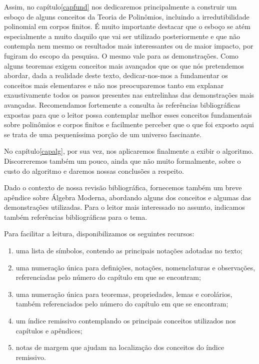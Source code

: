 Assim, no capítulo\xspace\ref{capfund} nos dedicaremos principalmente a
construir um esboço de alguns conceitos da Teoria de Polinômios,
incluindo a irredutibilidade polinomial em corpos finitos. É muito
importante destacar que o esboço se atém especialmente a muito daquilo
que vai
ser utilizado posteriormente e que não contempla nem mesmo os resultados
mais interessantes ou de maior impacto, por fugiram do escopo da
pesquisa. O mesmo vale para as
demonstrações. Como alguns teoremas exigem conceitos mais avançados que
os que nós pretendemos abordar, dada a realidade deste
texto,
dedicar-nos-mos a fundamentar os conceitos mais
elementares e não nos preocuparemos tanto em explanar exaustivamente
todos
os passos presentes nas entrelinhas das demonstrações mais
avançadas. Recomendamos fortemente a consulta às referências
bibliográficas expostas para que o leitor possa contemplar melhor esses
conceitos fundamentais sobre polinômios e corpos finitos e facilmente
perceber que o que foi exposto aqui se trata de uma pequeníssima porção
de um universo fascinante.

No capítulo\xspace\ref{capalg}, por sua vez, nos aplicaremos finalmente
a exibir
o algoritmo. Discorreremos também um pouco, ainda que não muito
formalmente, sobre o custo do algoritmo e daremos nossas conclusões a
respeito.

Dado o contexto de nossa revisão bibliográfica, fornecemos também um
breve apêndice sobre Álgebra Moderna, abordando alguns dos conceitos e
algumas das demonstrações utilizadas. Para o leitor mais interessado no
assunto, indicamos também referências bibliográficas para o tema.

Para facilitar a leitura, disponibilizamos os seguintes recursos:
\begin{enumerate}
  \item uma lista de símbolos, contendo as principais notações adotadas
  no texto;
  \item uma numeração única para definições, notações, nomenclaturas e
  ob\-ser\-va\-ções, referenciadas pelo número do capítulo em que se
  encontram;
  \item uma numeração única para teoremas, propriedades, lemas e
  corolários, também referenciados pelo número do capítulo em que se
  encontram;
  \item um índice remissivo contemplando os principais conceitos
  utilizados nos capítulos e apêndices;
  \item notas de margem que ajudam na localização dos conceitos do
  índice remissivo.
\end{enumerate}

